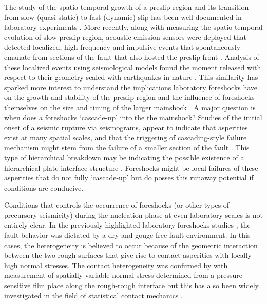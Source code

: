 \documentclass[preprint,1p, 10pt,authoryear]{elsarticle}
\begin{document}
The study of the spatio-temporal growth of a preslip region  and its transition from slow (quasi-static) to fast (dynamic) slip has been well documented in laboratory experiments \citep{Dieterich1978,Okubo1984, Ohnaka1999, Nielsen2010, Latour2013, Fukuyama2018, Zhuo2018, Ke2018, Buijze2020}. More recently, along with measuring the spatio-temporal evolution of slow preslip region, acoustic emission sensors were deployed that detected localized, high-frequency and impulsive events that spontaneously emanate from sections of the fault that also hosted the preslip front \citep{Ma2002, McLaskey2013, Selvadurai2015, Zhuo2018a}.  Analysis of these localized events using seismological models found the moment released with respect to their geometry scaled with earthquakes in nature \citep{McLaskey2014, Selvadurai2019}. This similarity has sparked more interest to understand the implications laboratory foreshocks have on the growth and stability of the preslip region and the influence of foreshocks themselves on the size and timing of the larger mainshock \citep{McLaskey2019}.  A major question is when does a foreshocks `cascade-up' into the the mainshock? Studies of the initial onset of a seismic rupture via seismograms, appear to indicate that asperities exist at many spatial scales, and that the triggering of cascading-style failure mechanism might stem from the failure of a smaller section of the fault \citep{Okuda2018, Ide2019}. This type of hierarchical breakdown may be indicating the possible existence of a hierarchical plate interface structure \citep{Ide2005, Aochi2014, Aochi2017}.  Foreshocks might be local failures of these asperities that do not fully `cascade-up' but do posses this runaway potential if conditions are conducive. 

Conditions that controls the occurrence of foreshocks (or other types of precursory seismicity) during the nucleation phase at even laboratory scales is not entirely clear. In the previously highlighted laboratory foreshocks studies \citep{McLaskey2013, Selvadurai2015}, the fault behavior was dictated by a dry and gouge-free fault environment.  In this cases, the heterogeneity is believed to occur because of the geometric interaction between the two rough surfaces that give rise to contact asperities with locally high normal stresses.  The contact heterogeneity was confirmed by \citet{Selvadurai2017} with measurement of spatially variable normal stress determined from a pressure sensitive film place along the rough-rough interface but this has also been widely investigated in the field of statistical contact mechanics \citep[e.g.][]{Greenwood1966,Johnson1985, Persson2006}. 
\end{document}
